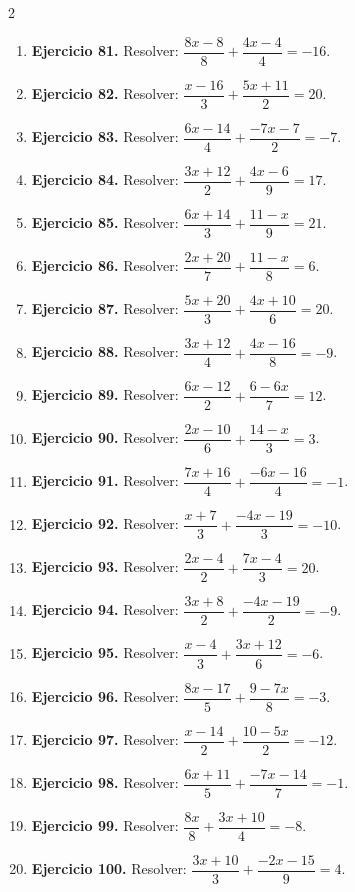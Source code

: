 \documentclass[10pt,a4paper]{article}
\begin{document}
\begin{multicols}{2}
\begin{enumerate}[label=\textbf{\arabic*.}]
\item \textbf{Ejercicio 81.} Resolver: \(\dfrac{8 x - 8}{8}+\dfrac{4 x - 4}{4}=-16\).
\item \textbf{Ejercicio 82.} Resolver: \(\dfrac{x - 16}{3}+\dfrac{5 x + 11}{2}=20\).
\item \textbf{Ejercicio 83.} Resolver: \(\dfrac{6 x - 14}{4}+\dfrac{- 7 x - 7}{2}=-7\).
\item \textbf{Ejercicio 84.} Resolver: \(\dfrac{3 x + 12}{2}+\dfrac{4 x - 6}{9}=17\).
\item \textbf{Ejercicio 85.} Resolver: \(\dfrac{6 x + 14}{3}+\dfrac{11 - x}{9}=21\).
\item \textbf{Ejercicio 86.} Resolver: \(\dfrac{2 x + 20}{7}+\dfrac{11 - x}{8}=6\).
\item \textbf{Ejercicio 87.} Resolver: \(\dfrac{5 x + 20}{3}+\dfrac{4 x + 10}{6}=20\).
\item \textbf{Ejercicio 88.} Resolver: \(\dfrac{3 x + 12}{4}+\dfrac{4 x - 16}{8}=-9\).
\item \textbf{Ejercicio 89.} Resolver: \(\dfrac{6 x - 12}{2}+\dfrac{6 - 6 x}{7}=12\).
\item \textbf{Ejercicio 90.} Resolver: \(\dfrac{2 x - 10}{6}+\dfrac{14 - x}{3}=3\).
\item \textbf{Ejercicio 91.} Resolver: \(\dfrac{7 x + 16}{4}+\dfrac{- 6 x - 16}{4}=-1\).
\item \textbf{Ejercicio 92.} Resolver: \(\dfrac{x + 7}{3}+\dfrac{- 4 x - 19}{3}=-10\).
\item \textbf{Ejercicio 93.} Resolver: \(\dfrac{2 x - 4}{2}+\dfrac{7 x - 4}{3}=20\).
\item \textbf{Ejercicio 94.} Resolver: \(\dfrac{3 x + 8}{2}+\dfrac{- 4 x - 19}{2}=-9\).
\item \textbf{Ejercicio 95.} Resolver: \(\dfrac{x - 4}{3}+\dfrac{3 x + 12}{6}=-6\).
\item \textbf{Ejercicio 96.} Resolver: \(\dfrac{8 x - 17}{5}+\dfrac{9 - 7 x}{8}=-3\).
\item \textbf{Ejercicio 97.} Resolver: \(\dfrac{x - 14}{2}+\dfrac{10 - 5 x}{2}=-12\).
\item \textbf{Ejercicio 98.} Resolver: \(\dfrac{6 x + 11}{5}+\dfrac{- 7 x - 14}{7}=-1\).
\item \textbf{Ejercicio 99.} Resolver: \(\dfrac{8 x}{8}+\dfrac{3 x + 10}{4}=-8\).
\item \textbf{Ejercicio 100.} Resolver: \(\dfrac{3 x + 10}{3}+\dfrac{- 2 x - 15}{9}=4\).
\end{enumerate}
\end{multicols}
\newpage
\end{document}
